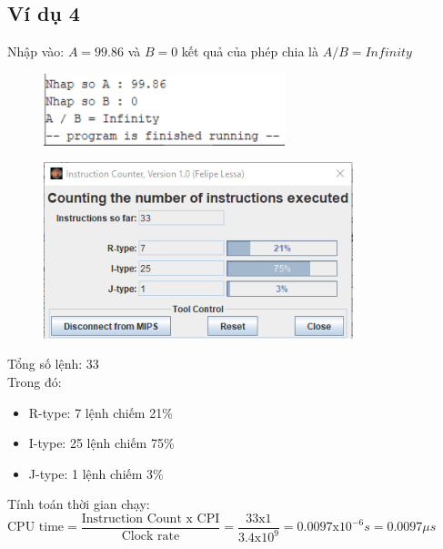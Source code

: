 \documentclass[a4paper]{article}
\begin{document}
\subsection{Ví dụ 4}
Nhập vào: $A = 99.86$ và $B = 0$ kết quả của phép chia là $A / B = Infinity$
\begin{center}
	\begin{figure}[h!]
		\begin{center}
			\includegraphics[width=7cm]{Images/10.png}
		\end{center}
	\end{figure}
\end{center}
\begin{center}
	\begin{figure}[h!]
		\begin{center}
			\includegraphics[width=9cm]{Images/11.png}
		\end{center}
	\end{figure}
\end{center}
Tổng số lệnh: 33\\
Trong đó:
\begin{itemize}
	\item R-type: 7 lệnh chiếm 21\%
	\item I-type: 25 lệnh chiếm 75\%
	\item J-type: 1 lệnh chiếm 3\%
\end{itemize}
Tính toán thời gian chạy:\\
$\text{CPU time} = \dfrac{\text{Instruction Count x CPI}}{\text{Clock rate}} = \dfrac{33\text{x}1}{3.4\text{x}10^9} = 0.0097 \text{x}10^{-6} s = 0.0097 \mu s$
\end{document}
